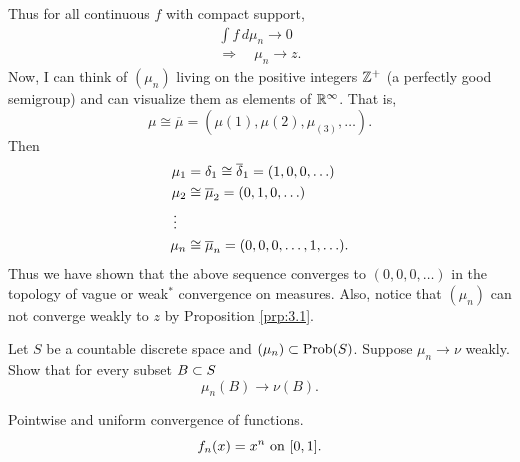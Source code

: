 Thus for all continuous $f$ with compact support,
\[
\begin{gathered}
       \int f\, d\mu_n \to 0                      \\
     \Rightarrow \quad \mu_n \to z.
\end{gathered}
\]
Now, I can think of $(\mu_n)$ living on the positive integers $\mathbb{Z}^+$ (a perfectly good semigroup) and can visualize them as elements of
$\mathbb{R}^\infty$.  
That is,
\[
     \mu \cong \overline \mu = (\mu(1),\mu(2),\mu_(3),\ldots).
\]
Then
\[
\begin{aligned}
       \mu_1 &= \delta_1 \cong \overline {\delta}_1 = (1,0,0,\ldots)   \\
       \mu_2 &\cong \overline \mu_2 = (0,1,0,\ldots)           \\
       \vdots \ \ &                                            \\
       \mu_n &\cong \overline \mu_n = (0,0,0,\ldots,1,\ldots).
\end{aligned}
\]
Thus we have shown that the above sequence converges to 
$(0,0,0,\ldots)$ in the topology of vague or weak$^*$ convergence on
measures.  
Also, notice that $(\mu_n)$ can not converge weakly to $z$ by Proposition \ref{prp:3.1}.

Let $S$ be a countable discrete space and $(\mu_n) \subset \hbox{Prob}(S)$.  Suppose $\mu_n \to \nu$ weakly.  
Show that for every subset $B \subset S$
\[
     \mu_n(B) \to \nu(B).
\]

\begin{example}	\label{exm:}
Pointwise and uniform convergence of functions.
\[
     f_n(x) = x^n \hbox{ on } [0,1].
\]
\end{example}
